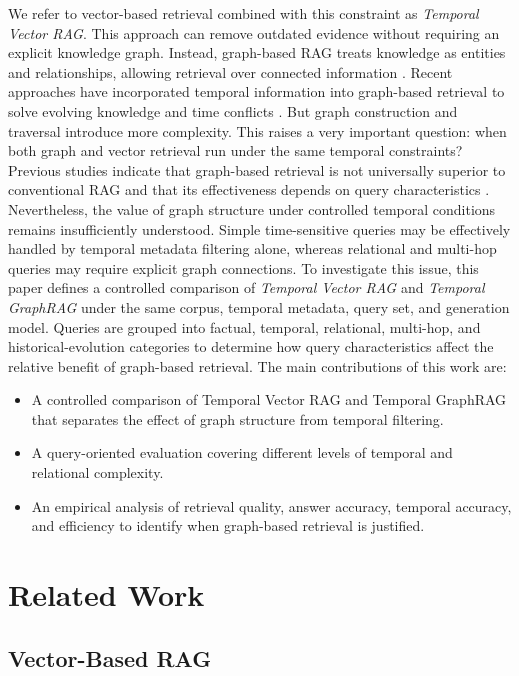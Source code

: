 \documentclass[conference]{IEEEtran}
\numberwithin{equation}{section}
\begin{document}
We refer to vector-based retrieval combined with this constraint as \textit{Temporal Vector RAG}. This approach can remove outdated evidence without requiring an explicit knowledge graph. Instead, graph-based RAG treats knowledge as entities and relationships, allowing retrieval over connected information \cite{Edge2024,Guo2024,Gutierrez2024}. Recent approaches have incorporated temporal information into graph-based retrieval to solve evolving knowledge and time conflicts \cite{Han2025TGRAG,Li2025TGRAG}. But graph construction and traversal
introduce more complexity. This raises a very important question: when both graph and vector retrieval run under the same temporal constraints? Previous studies indicate that graph-based retrieval is not universally superior to conventional RAG and that its effectiveness depends on query characteristics \cite{Xiang2025}. Nevertheless, the value of graph  structure under controlled temporal conditions remains insufficiently understood. Simple time-sensitive queries may be effectively handled by temporal metadata filtering alone, whereas relational and multi-hop queries may require explicit graph connections. To investigate this issue, this paper defines a controlled comparison of \textit{Temporal Vector RAG} and \textit{Temporal GraphRAG} under the same corpus, temporal metadata, query set, and generation model. Queries are grouped into factual, temporal, relational, multi-hop, and historical-evolution categories to determine how query characteristics affect the relative benefit of graph-based retrieval. The main contributions of this work are:

\begin{itemize}

    \item A controlled comparison of Temporal Vector RAG and Temporal GraphRAG that separates the effect of graph structure from temporal filtering.
    \item A query-oriented evaluation covering different levels of temporal and relational complexity.
    \item An empirical analysis of retrieval quality, answer accuracy, temporal accuracy, and efficiency to identify when graph-based retrieval is justified.
\end{itemize}

\section{Related Work}

\subsection{Vector-Based RAG}
\end{document}
